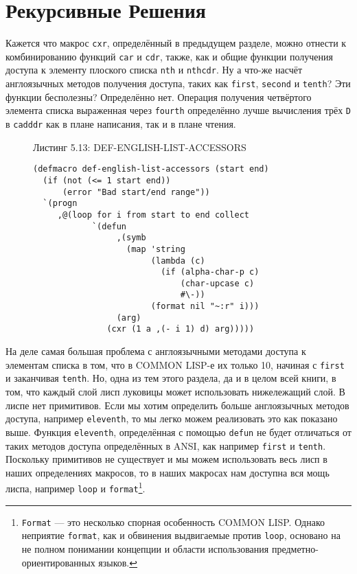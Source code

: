 \section{Рекурсивные Решения}\label{section_recursive_solutions}

Кажется что макрос \verb"cxr", определённый в предыдущем разделе, можно отнести к комбинированию функций \verb"car" и \verb"cdr", также, как и общие функции получения доступа к элементу плоского списка \verb"nth" и \verb"nthcdr". Ну а что-же насчёт англоязычных методов получения доступа, таких как \verb"first", \verb"second" и \verb"tenth"? Эти функции бесполезны? Определённо нет. Операция получения четвёртого элемента списка выраженная через \verb"fourth" определённо лучше вычисления трёх \verb"D" в \verb"cadddr" как в плане написания, так и в плане чтения.

\begin{figure}Листинг 5.13: DEF-ENGLISH-LIST-ACCESSORS\label{listing_5.13}
\listbegin
\begin{verbatim}
(defmacro def-english-list-accessors (start end)
  (if (not (<= 1 start end))
      (error "Bad start/end range"))
  `(progn
     ,@(loop for i from start to end collect
            `(defun
                 ,(symb
                   (map 'string
                        (lambda (c)
                          (if (alpha-char-p c)
                              (char-upcase c)
                              #\-))
                        (format nil "~:r" i)))
                 (arg)
               (cxr (1 a ,(- i 1) d) arg)))))
\end{verbatim}
\listend
\end{figure}

На деле самая большая проблема с англоязычными методами доступа к элементам списка в том, что в COMMON LISP-е их только 10, начиная с \verb"first" и заканчивая \verb"tenth". Но, одна из тем этого раздела, да и в целом всей книги, в том, что каждый слой лисп луковицы может использовать нижележащий слой. В лиспе нет примитивов. Если мы хотим определить больше англоязычных методов доступа, например \verb"eleventh", то мы легко можем реализовать это как показано выше. Функция \verb"eleventh", определённая с помощью \verb"defun" не будет отличаться от таких методов доступа определённых в ANSI, как например \verb"first" и \verb"tenth". Поскольку примитивов не существует и мы можем использовать весь лисп в наших определениях макросов, то в наших макросах нам доступна вся мощь лиспа, например \verb"loop" и \verb"format"\footnote{\verb"Format" --- это несколько спорная особенность COMMON LISP. Однако неприятие \verb"format", как и обвинения выдвигаемые против \verb"loop", основано на не полном понимании концепции и области использования предметно-ориентированных языков.}.



